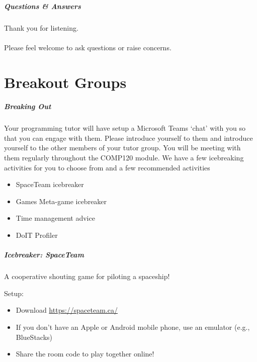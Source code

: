 
\begin{frame}
	\frametitle{Questions \& Answers}	
	\begin{center}
		Thank you for listening. 
		\\~\\
		Please feel welcome to ask questions or raise concerns.
	\end{center}
\end{frame}

\part{Breakout Groups}
\frame{\partpage}

\begin{frame}
	\frametitle{Breaking Out}
	
	Your programming tutor will have setup a Microsoft Teams `chat' with you so that you can engage with them. Please introduce yourself to them and introduce yourself to the other members of your tutor group. You will be meeting with them regularly throughout the COMP120 module. We have a few icebreaking activities for you to choose from and a few recommended activities
	
	\begin{itemize}
		\item SpaceTeam icebreaker
		\item Games Meta-game icebreaker
		\item Time management advice
		\item DoIT Profiler
	\end{itemize}
\end{frame}

\begin{frame}
	\frametitle{Icebreaker: SpaceTeam}
	
	A cooperative shouting game for piloting a spaceship!
	
	Setup:
	
	\begin{itemize}
		\item Download \url{https://spaceteam.ca/}
		\item If you don't have an Apple or Android mobile phone, use an emulator (e.g., BlueStacks)
		\item Share the room code to play together online!
	\end{itemize}
	
\end{frame}

